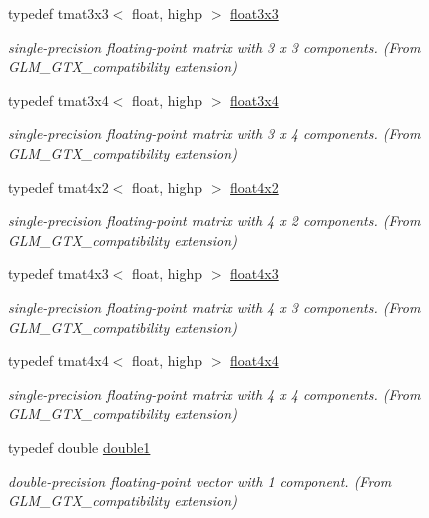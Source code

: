 \begin{DoxyCompactItemize}
typedef tmat3x3$<$ float, highp $>$ \hyperlink{group__gtx__compatibility_ga75c991509a4c4894f10ab480f89e39e7}{float3x3}
\begin{DoxyCompactList}\small\item\em single-\/precision floating-\/point matrix with 3 x 3 components. (From G\+L\+M\+\_\+\+G\+T\+X\+\_\+compatibility extension) \end{DoxyCompactList}\item 
typedef tmat3x4$<$ float, highp $>$ \hyperlink{group__gtx__compatibility_gadbca4a528b4ef17b78afe91c00420087}{float3x4}
\begin{DoxyCompactList}\small\item\em single-\/precision floating-\/point matrix with 3 x 4 components. (From G\+L\+M\+\_\+\+G\+T\+X\+\_\+compatibility extension) \end{DoxyCompactList}\item 
typedef tmat4x2$<$ float, highp $>$ \hyperlink{group__gtx__compatibility_ga4cb477bf8e9167ab065aa70c7767e329}{float4x2}
\begin{DoxyCompactList}\small\item\em single-\/precision floating-\/point matrix with 4 x 2 components. (From G\+L\+M\+\_\+\+G\+T\+X\+\_\+compatibility extension) \end{DoxyCompactList}\item 
typedef tmat4x3$<$ float, highp $>$ \hyperlink{group__gtx__compatibility_gaa0c1ca31e5e064223cc7cfc0344ac787}{float4x3}
\begin{DoxyCompactList}\small\item\em single-\/precision floating-\/point matrix with 4 x 3 components. (From G\+L\+M\+\_\+\+G\+T\+X\+\_\+compatibility extension) \end{DoxyCompactList}\item 
typedef tmat4x4$<$ float, highp $>$ \hyperlink{group__gtx__compatibility_ga67688a2f2fc6386544d1a47a5d430467}{float4x4}
\begin{DoxyCompactList}\small\item\em single-\/precision floating-\/point matrix with 4 x 4 components. (From G\+L\+M\+\_\+\+G\+T\+X\+\_\+compatibility extension) \end{DoxyCompactList}\item 
typedef double \hyperlink{group__gtx__compatibility_gab8b88350212cea916857cb2f49b8a29f}{double1}
\begin{DoxyCompactList}\small\item\em double-\/precision floating-\/point vector with 1 component. (From G\+L\+M\+\_\+\+G\+T\+X\+\_\+compatibility extension) \end{DoxyCompactList}\item 

\end{DoxyCompactItemize}

